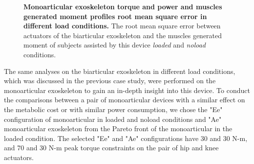 \documentclass[10pt,letterpaper]{article}
\begin{document}
\begin{figure}[ht!]
	\centering
	\hfil
	\vspace{1mm}
	\caption{\small{\textbf{Monoarticular exoskeleton torque and power and muscles generated moment profiles root mean square error in different load conditions.} The root mean square error between actuators of the biarticular exoskeleton and the muscles generated moment of subjects assisted by this device {\it loaded} and {\it noload} conditions.}}
	\label{Fig_Case04_RMSE}
\end{figure}
The same analyses on the biarticular exoskeleton in different load conditions, which was discussed in the previous case study,  were performed on the monoarticular exoskeleton to gain an in-depth insight into this device. To conduct the comparisons between a pair of monoarticular devices with a similar effect on the metabolic cost or with similar power consumption, we chose the "Ee" configuration of monoarticular in loaded and noload conditions and "Ae" monoarticular exoskeleton from the Pareto front of the monoarticular in the loaded condition. The selected "Ee" and "Ae" configurations have 30 and 30 N-m, and 70 and 30 N-m peak torque constraints on the pair of hip and knee actuators.\\
\end{document}
